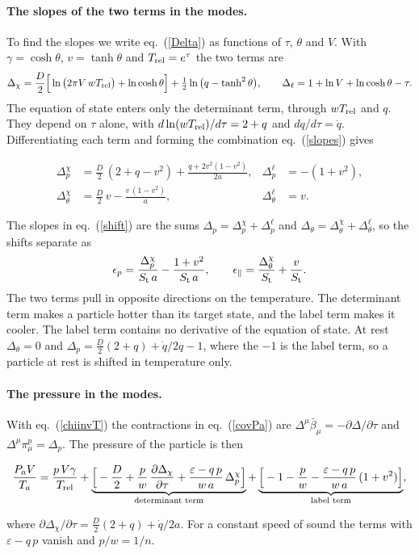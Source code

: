 \documentclass[11pt,aps,preprint,nofootinbib,superscriptaddress,tightenlines]{revtex4-2}
\def\st{\begin{equation}}
\def\stp{\end{equation}}
\def\Eq#1{eq.~(\ref{#1})}
\let\oldparagraph\paragraph
\renewcommand{\paragraph}{\par\bigskip\oldparagraph}
\begin{document}
\paragraph{The slopes of the two terms in the modes.}  To find the slopes we write \Eq{Delta} as functions of $\tau$, $\theta$ and $V$.  With
$\gamma=\cosh\theta$, $v=\tanh\theta$ and $T_{\rm rel}=e^{\tau}$ the two terms are
\st
\Delta_\chi=\frac D2\Big[\ln\big(2\pi V\,wT_{\rm rel}\big)+\ln\cosh\theta\Big]+\tfrac12\ln\big(q-\tanh^2\theta\big),\qquad
\Delta_\ell=1+\ln V+\ln\cosh\theta-\tau .
\stp
The equation of state enters only the determinant term, through $wT_{\rm rel}$ and $q$.  They depend on $\tau$ alone, with
$d\ln(wT_{\rm rel})/d\tau=2+q$ and $dq/d\tau=\dot q$.  Differentiating each term and forming the combination \Eq{slopes} gives
\begin{keyeq}
\begin{align}
\Delta_p^{\chi}&=\frac D2\,(2+q-v^2)+\frac{\dot q+2v^2(1-v^2)}{2a}, & \Delta_p^{\ell}&=-(1+v^2), \nonumber\\
\Delta_\theta^{\chi}&=\frac D2\,v-\frac{v\,(1-v^2)}a, & \Delta_\theta^{\ell}&=v .
\label{Dderiv}
\end{align}
\end{keyeq}
The slopes in \Eq{shift} are the sums $\Delta_p=\Delta_p^\chi+\Delta_p^\ell$ and $\Delta_\theta=\Delta_\theta^\chi+\Delta_\theta^\ell$, so the shifts
separate as
\st
\epsilon_p=\frac{\Delta_p^{\chi}}{S_{\rm t}\,a}-\frac{1+v^2}{S_{\rm t}\,a},\qquad
\epsilon_\parallel=\frac{\Delta_\theta^{\chi}}{S_{\rm t}}+\frac v{S_{\rm t}} .
\stp
The two terms pull in opposite directions on the temperature.  The determinant term makes a particle hotter than its target state, and the label
term makes it cooler.  The label term contains no derivative of the equation of state.  At rest $\Delta_\theta=0$ and
$\Delta_p=\tfrac D2(2+q)+\dot q/2q-1$, where the $-1$ is the label term, so a particle at rest is shifted in temperature only.

\paragraph{The pressure in the modes.}  With \Eq{chiinvT} the contractions in \Eq{covPa} are $\Delta^\mu\bar\beta_\mu=-\partial\Delta/\partial\tau$ and
$\Delta^\mu\pi^p_\mu=\Delta_p$.  The pressure of the particle is then
\begin{keyeq}
\st
\frac{P_aV}{T_a}=\frac{p\,V\gamma}{T_{\rm rel}}
+\underbrace{\Big[-\frac D2+\frac pw\,\frac{\partial\Delta_\chi}{\partial\tau}+\frac{\varepsilon-q\,p}{w\,a}\,\Delta_p^{\chi}\Big]}_{\text{determinant term}}
+\underbrace{\Big[-1-\frac pw-\frac{\varepsilon-q\,p}{w\,a}\,(1+v^2)\Big]}_{\text{label term}} ,
\label{Pa}
\stp
\end{keyeq}
where $\partial\Delta_\chi/\partial\tau=\tfrac D2(2+q)+\dot q/2a$.  For a constant speed of sound the terms with $\varepsilon-q\,p$ vanish and $p/w=1/n$.
\end{document}
